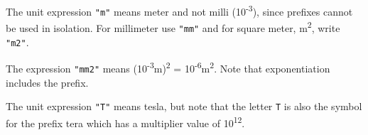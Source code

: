 \begin{example}
The unit expression \lstinline!"m"! means meter and not milli (10\textsuperscript{-3}), since prefixes cannot be used in isolation.
For millimeter use \lstinline!"mm"! and for square meter, m\textsuperscript{2}, write \lstinline!"m2"!.

The expression \lstinline!"mm2"! means (10\textsuperscript{-3}m)\textsuperscript{2} = 10\textsuperscript{-6}m\textsuperscript{2}.
Note that exponentiation includes the prefix.

The unit expression \lstinline!"T"! means tesla, but note that the letter \lstinline!T! is also the symbol for the prefix tera which has a multiplier value of 10\textsuperscript{12}.
\end{example}
